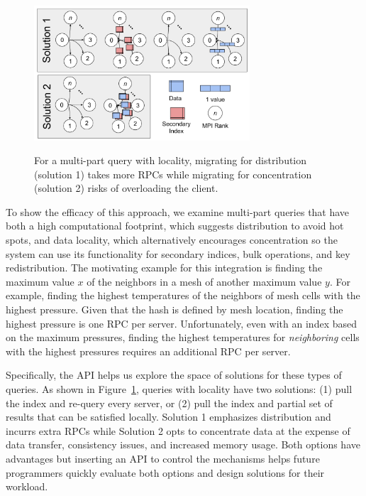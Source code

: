 \begin{figure}[t]
  \noindent\includegraphics[width=19pc,angle=0]{figures/example.png}\\
  \caption{For a multi-part query with locality, migrating for distribution
  (solution 1) takes more RPCs while migrating for concentration (solution 2)
  risks of overloading the client.}
  \label{fig:example}
\end{figure}

To show the efficacy of this approach, we examine multi-part queries that have
both a high computational footprint, which suggests distribution to avoid hot
spots, and data locality, which alternatively encourages concentration so the
system can use its functionality for secondary indices, bulk operations, and
key redistribution.  The motivating example for this integration is finding the
maximum value \(x\) of the neighbors in a mesh of another maximum value \(y\).
For example, finding the highest temperatures of the neighbors of mesh cells
with the highest pressure. Given that the hash is defined by mesh location,
finding the highest pressure is one RPC per server.  Unfortunately, even
with an index based on the maximum pressures, finding the highest temperatures
for {\it neighboring} cells with the highest pressures requires an additional
RPC per server. 

Specifically, the API helps us explore the space of solutions for these types
of queries. As shown in Figure~\ref{fig:example}, queries with locality have
two solutions: (1) pull the index and re-query every server, or (2) pull the
index and partial set of results that can be satisfied locally. Solution 1
emphasizes distribution and incurrs extra RPCs while Solution 2 opts to
concentrate data at the expense of data transfer, consistency issues, and
increased memory usage.  Both options have advantages but inserting an API to
control the mechanisms helps future programmers quickly evaluate both options
and design solutions for their workload.

